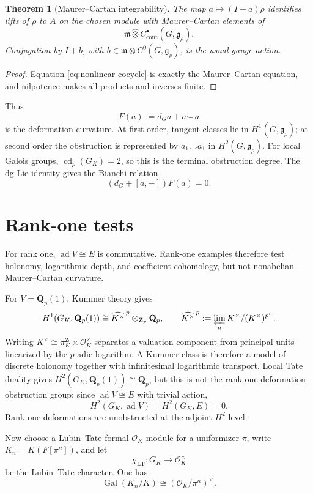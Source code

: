 \documentclass[11pt]{article}
\newtheorem{theorem}{Theorem}[section]
\theoremstyle{definition}
\newcommand{\Qp}{\mathbf Q_p}
\newcommand{\Zp}{\mathbf Z_p}
\newcommand{\OK}{\mathcal O_K}
\newcommand{\GK}{G_K}
\newcommand{\ad}{\operatorname{ad}}
\newcommand{\Gal}{\operatorname{Gal}}
\begin{document}
\begin{theorem}[Maurer--Cartan integrability]\label{thm:MC}
The map $a\mapsto(I+a)\rho$ identifies lifts of $\rho$ to $A$ on the chosen module with Maurer--Cartan elements of
\[
\mathfrak m\widehat\otimes C^\bullet_{\mathrm{cont}}(G,\mathfrak g_\rho).
\]
Conjugation by $I+b$, with $b\in\mathfrak m\otimes C^0(G,\mathfrak g_\rho)$, is the usual gauge action.
\end{theorem}

\begin{proof}
Equation \eqref{eq:nonlinear-cocycle} is exactly the Maurer--Cartan equation, and nilpotence makes all products and inverses finite.
\end{proof}

Thus
\[
F(a):=d_Ga+a\smile a
\]
is the deformation curvature.  At first order, tangent classes lie in $H^1(G,\mathfrak g_\rho)$; at second order the obstruction is represented by $a_1\smile a_1$ in $H^2(G,\mathfrak g_\rho)$.  For local Galois groups, $\operatorname{cd}_p(G_K)=2$, so this is the terminal obstruction degree.  The dg-Lie identity gives the Bianchi relation
\[
(d_G+[a,-])F(a)=0.
\]

\section{Rank-one tests}

For rank one, $\ad V\cong E$ is commutative.  Rank-one examples therefore test holonomy, logarithmic depth, and coefficient cohomology, but not nonabelian Maurer--Cartan curvature.

For $V=\Qp(1)$, Kummer theory gives
\begin{equation}\label{eq:kummer}
H^1(\GK,\Qp(1))
\cong
\widehat{K^\times}^{\,p}\otimes_{\Zp}\Qp,
\qquad
\widehat{K^\times}^{\,p}:=\varprojlim_n K^\times/(K^\times)^{p^n}.
\end{equation}
Writing $K^\times\cong\pi_K^{\mathbf Z}\times\OK^\times$ separates a valuation component from principal units linearized by the $p$-adic logarithm.  A Kummer class is therefore a model of discrete holonomy together with infinitesimal logarithmic transport.  Local Tate duality gives $H^2(\GK,\Qp(1))\cong\Qp$, but this is not the rank-one deformation-obstruction group: since $\ad V\cong E$ with trivial action,
\[
H^2(\GK,\ad V)=H^2(\GK,E)=0.
\]
Rank-one deformations are unobstructed at the adjoint $H^2$ level.

Now choose a Lubin--Tate formal $\OK$-module for a uniformizer $\pi$, write $K_n=K(F[\pi^n])$, and let
\[
\chi_{\mathrm{LT}}:G_K\longrightarrow\OK^\times
\]
be the Lubin--Tate character.  One has
\begin{equation}\label{eq:LT-gal}
\Gal(K_n/K)\cong(\OK/\pi^n)^\times.
\end{equation}
\end{document}
